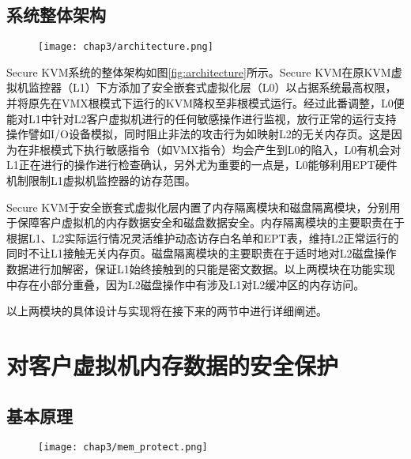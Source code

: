 \subsection{系统整体架构}

\begin{figure}[!htbp]
  \centering
  \texttt{[image: chap3/architecture.png]}
\end{figure}

Secure KVM系统的整体架构如图\ref{fig:architecture}所示。Secure KVM在原KVM虚拟机监控器（L1）下方添加了安全嵌套式虚拟化层（L0）以占据系统最高权限，并将原先在VMX根模式下运行的KVM降权至非根模式运行。经过此番调整，L0便能对L1中针对L2客户虚拟机进行的任何敏感操作进行监视，放行正常的运行支持操作譬如I/O设备模拟，同时阻止非法的攻击行为如映射L2的无关内存页。这是因为在非根模式下执行敏感指令（如VMX指令）均会产生到L0的陷入，L0有机会对L1正在进行的操作进行检查确认，另外尤为重要的一点是，L0能够利用EPT硬件机制限制L1虚拟机监控器的访存范围。

Secure KVM于安全嵌套式虚拟化层内置了内存隔离模块和磁盘隔离模块，分别用于保障客户虚拟机的内存数据安全和磁盘数据安全。内存隔离模块的主要职责在于根据L1、L2实际运行情况灵活维护动态访存白名单和EPT表，维持L2正常运行的同时不让L1接触无关内存页。磁盘隔离模块的主要职责在于适时地对L2磁盘操作数据进行加解密，保证L1始终接触到的只能是密文数据。以上两模块在功能实现中存在小部分重叠，因为L2磁盘操作中有涉及L1对L2缓冲区的内存访问。

以上两模块的具体设计与实现将在接下来的两节中进行详细阐述。

\section{对客户虚拟机内存数据的安全保护}

\subsection{基本原理}

\begin{figure}[!htbp]
  \centering
  \texttt{[image: chap3/mem\_protect.png]}
\end{figure}

